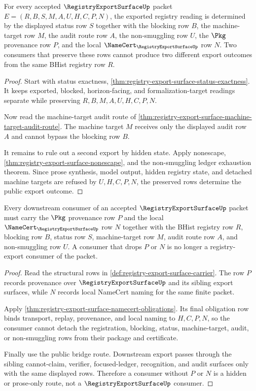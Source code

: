 \begin{theorem}
\label{thm:registryexportsurface-export-determinacy}
For every accepted $\RegistryExportSurfaceUp$ packet $E=(R,B,S,M,A,U,H,C,P,N)$, the exported registry reading is determined by the displayed status row $S$ together with the blocking row $B$, the machine-target row $M$, the audit route row $A$, the non-smuggling row $U$, the $\Pkg$ provenance row $P$, and the local $\NameCert_{\RegistryExportSurfaceUp}$ row $N$. Two consumers that preserve these rows cannot produce two different export outcomes from the same BHist registry row $R$.
\end{theorem}
\begin{proof}
Start with status exactness, \autoref{thm:registry-export-surface-status-exactness}. It keeps exported, blocked, horizon-facing, and formalization-target readings separate while preserving $R,B,M,A,U,H,C,P,N$.

Now read the machine-target audit route of \autoref{thm:registry-export-surface-machine-target-audit-route}. The machine target $M$ receives only the displayed audit row $A$ and cannot bypass the blocking row $B$.

It remains to rule out a second export by hidden state. Apply nonescape, \autoref{thm:registry-export-surface-nonescape}, and the non-smuggling ledger exhaustion theorem. Since prose synthesis, model output, hidden registry state, and detached machine targets are refused by $U,H,C,P,N$, the preserved rows determine the public export outcome.
\end{proof}

\begin{theorem}
\label{thm:registryexportsurface-consumer-provenance}
Every downstream consumer of an accepted $\RegistryExportSurfaceUp$ packet must carry the $\Pkg$ provenance row $P$ and the local $\NameCert_{\RegistryExportSurfaceUp}$ row $N$ together with the BHist registry row $R$, blocking row $B$, status row $S$, machine-target row $M$, audit route row $A$, and non-smuggling row $U$. A consumer that drops $P$ or $N$ is no longer a registry-export consumer of the packet.
\end{theorem}
\begin{proof}
Read the structural rows in \autoref{def:registry-export-surface-carrier}. The row $P$ records provenance over $\RegistryExportSurfaceUp$ and its sibling export surfaces, while $N$ records local NameCert naming for the same finite packet.

Apply \autoref{thm:registry-export-surface-namecert-obligations}. Its final obligation row binds transport, replay, provenance, and local naming to $H,C,P,N$, so the consumer cannot detach the registration, blocking, status, machine-target, audit, or non-smuggling rows from their package and certificate.

Finally use the public bridge route. Downstream export passes through the sibling cannot-claim, verifier, focused-ledger, recognition, and audit surfaces only with the same displayed rows. Therefore a consumer without $P$ or $N$ is a hidden or prose-only route, not a $\RegistryExportSurfaceUp$ consumer.
\end{proof}

